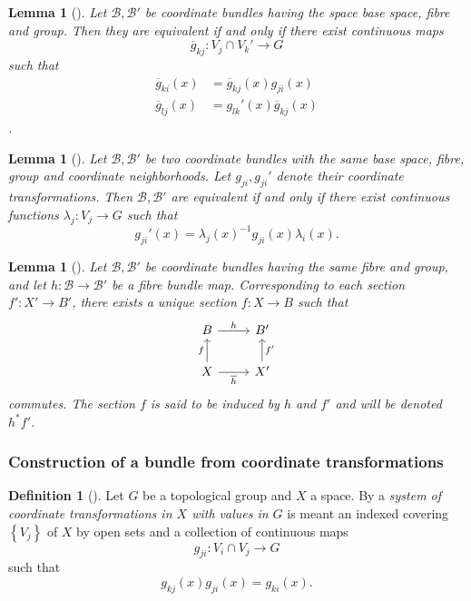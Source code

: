 \documentclass[reqno]{amsart}
\newtheorem{lemma}[theorem]{Lemma}
\theoremstyle{definition}
\newtheorem{definition}[theorem]{Definition}
\theoremstyle{remark}
\begin{document}
\begin{lemma}[]\label{bundle-equiv-in-terms-of-maps}
    Let $\mathcal{B},\mathcal{B}'$ be coordinate bundles
    having the space base space, fibre and group. Then
    they are equivalent if and only if
    there exist continuous maps
    \[
    \overline{g}_{kj} \colon V_j \cap V_{k}' \to G
    \] 
    such that
    \begin{align*}
        \overline{g}_{ki}(x) 
        &= \overline{g}_{kj}(x) g_{ji}(x)\\
        \overline{g}_{lj}(x) 
        &= g_{lk}'(x) \overline{g}_{kj}(x)
    \end{align*}.
\end{lemma}

\begin{lemma}[]
    Let $\mathcal{B},\mathcal{B}'$ be two coordinate bundles
    with the same base space, fibre, group and coordinate
    neighborhoods. Let
    $g_{ji}, g_{ji}'$ denote their coordinate transformations.
    Then $\mathcal{B}, \mathcal{B}'$ are equivalent
    if and only if there exist continuous functions
    $\lambda_j \colon V_j \to G$ such that
    \[
    g_{ji}'(x) = \lambda_j(x)^{-1} g_{ji}(x)
    \lambda_i(x).
    \] 
\end{lemma}

\begin{lemma}[]
    Let $\mathcal{B}, \mathcal{B}'$ be coordinate bundles
    having the same fibre and group, and let
    $h \colon \mathcal{B} \to \mathcal{B}'$ be a fibre
    bundle map. Corresponding to each
    section $f' \colon X' \to B'$, there
    exists a unique section
    $f \colon X \to B$ such that
    \begin{equation*}
    \begin{tikzcd}
        B  \ar[r, "h"] & B'  \\
        X \ar[r, "\overline{h}"'] \ar[u, "f"] & X' \ar[u, "f'"']
    \end{tikzcd}
    \end{equation*}
    commutes.
    The section  $f$ is said to be induced by
    $h$ and $f'$ and will be denoted
    $h^{*}f'$.
\end{lemma}

\subsubsection{Construction of a bundle from coordinate
transformations}
\begin{definition}[]
    Let $G$ be a topological group and $X$ a space.
    By a \textit{system of coordinate transformations in
    $X$ with values in $G$} is meant an indexed covering
    $\left\{ V_j \right\} $ of $X$ by open sets and
    a collection of continuous maps
    \[
    g_{ji} \colon V_{i} \cap V_j \to G
    \] 
    such that
     \[
    g_{kj}(x) g_{ji}(x) = g_{ki}(x).
    \] 
\end{definition}
\end{document}
